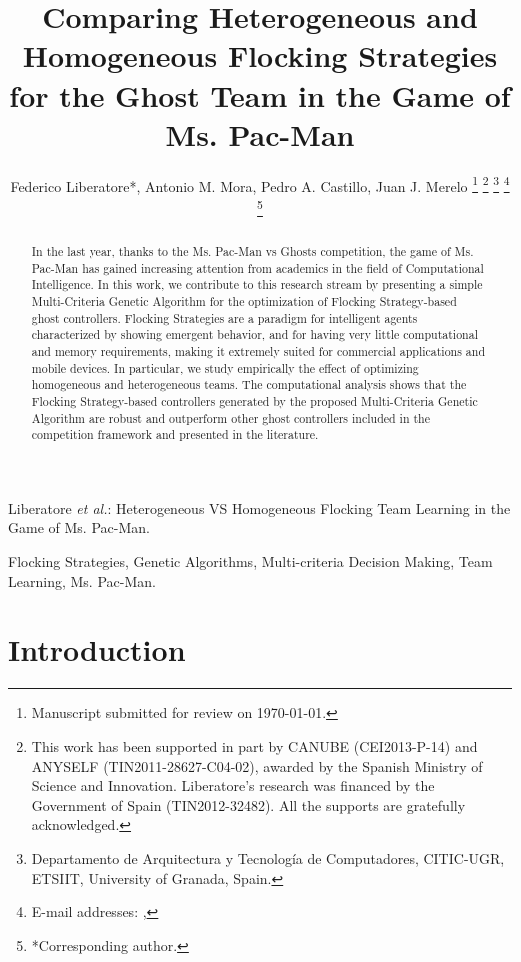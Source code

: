 \documentclass[journal]{IEEEtran}
\begin{document}
\title{Comparing Heterogeneous and Homogeneous Flocking Strategies for the Ghost Team in the Game of Ms. Pac-Man}

\author{Federico Liberatore*, Antonio M. Mora, Pedro A. Castillo, Juan J. Merelo
\thanks{Manuscript submitted for review on \today.}%
\thanks{This work has been supported in part by CANUBE (CEI2013-P-14) and ANYSELF (TIN2011-28627-C04-02), awarded by the Spanish Ministry of Science and Innovation. Liberatore's research was financed by the Government of Spain (TIN2012-32482). All the supports are gratefully acknowledged.}%
\thanks{Departamento de Arquitectura y Tecnología de Computadores,
CITIC-UGR, ETSIIT,
University of Granada, Spain.}%
\thanks{E-mail addresses: \mailsa, \mailsb}%
\thanks{*Corresponding author.}}

%
{Liberatore \MakeLowercase{\textit{et al.}}: Heterogeneous VS Homogeneous Flocking Team Learning in the Game of Ms. Pac-Man.}
\maketitle

\begin{abstract}
In the last year, thanks to the Ms. Pac-Man vs Ghosts competition, the
game of Ms. Pac-Man has gained increasing attention from academics in
the field of Computational Intelligence. In this work, we contribute
to this research stream by presenting a simple Multi-Criteria Genetic
Algorithm for the optimization of Flocking Strategy-based ghost
controllers. Flocking Strategies are a paradigm for intelligent agents
characterized by showing emergent behavior, and for having very little
computational and memory requirements, making it extremely suited for
commercial applications and mobile devices. In particular, we study
empirically the effect of optimizing homogeneous and heterogeneous
teams. The computational analysis shows that the Flocking
Strategy-based controllers generated by the proposed Multi-Criteria
Genetic Algorithm are robust and outperform other ghost controllers
included in the competition framework and presented in the
literature. 
\end{abstract}
\begin{IEEEkeywords}
Flocking Strategies, Genetic Algorithms, Multi-criteria Decision Making, Team Learning, Ms. Pac-Man.
\end{IEEEkeywords}

\section{Introduction}
\label{sec:Introduction}
\end{document}
